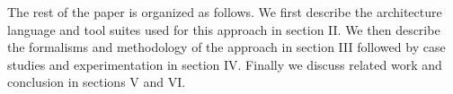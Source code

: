 
The rest of the paper is organized as follows. We first describe the architecture language and tool suites used for this approach in section II. We then describe the formalisms and methodology of the approach in section III followed by case studies and experimentation in section IV. Finally we discuss related work and conclusion in sections V and VI.  
